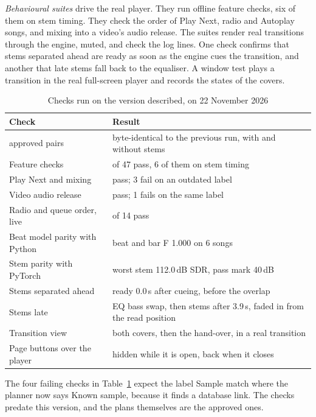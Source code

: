 \documentclass[conference,a4paper]{IEEEtran}
\newcommand{\q}[1]{\textquotedbl{}#1\textquotedbl{}}
\begin{document}
\emph{Behavioural suites} drive the real player. They run offline feature checks, six of them on
stem timing. They check the order of Play Next, radio and Autoplay songs, and mixing into a video's
audio release. The suites render real transitions through the engine, muted, and check the log
lines. One check confirms that stems separated ahead are ready as soon as the engine cues the
transition, and another that late stems fall back to the equaliser. A window test plays a transition
in the real full-screen player and records the states of the covers.

\begin{table}[t]
\caption{Checks run on the version described, on 22 November 2026}
\label{tab:tests}
\centering\footnotesize
\begin{tabular}{@{}>{\raggedright\arraybackslash}p{3.1cm}>{\raggedright\arraybackslash}p{4.8cm}@{}}
\toprule
Check & Result\\
\midrule
10 approved pairs & byte-identical to the previous run, with and without stems\\
Feature checks & 47 of 47 pass, 6 of them on stem timing\\
Play Next and mixing & 17 pass; 3 fail on an outdated label\\
Video audio release & 5 pass; 1 fails on the same label\\
Radio and queue order, live & 14 of 14 pass\\
Beat model parity with Python & beat and bar F 1.000 on 6 songs\\
Stem parity with PyTorch & worst stem 112.0\,dB SDR, pass mark 40\,dB\\
Stems separated ahead & ready 0.0\,s after cueing, before the overlap\\
Stems late & EQ bass swap, then stems after 3.9\,s, faded in from the read position\\
Transition view & both covers, then the hand-over, in a real transition\\
Page buttons over the player & hidden while it is open, back when it closes\\
\bottomrule
\end{tabular}
\end{table}

The four failing checks in Table~\ref{tab:tests} expect the label \q{Sample match} where the planner
now says \q{Known sample}, because it finds a database link. The checks predate this version, and
the plans themselves are the approved ones.
\end{document}
